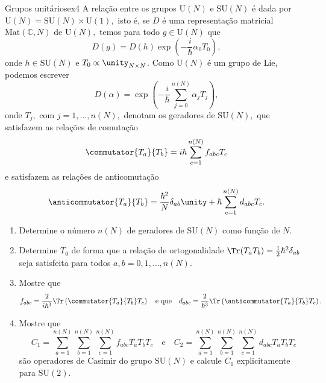 \begin{exercício}{Grupos unitários}{ex4}
    A relação entre os grupos \(\mathrm{U}(N)\) e \(\mathrm{SU}(N)\) é dada por \(\mathrm{U}(N) = \mathrm{SU}(N) \times \mathrm{U}(1),\) isto é, se \(D\) é uma representação matricial \(\mathrm{Mat}(\mathbb{C}, N)\) de \(\mathrm{U}(N),\) temos para todo \(g \in \mathrm{U}(N)\) que
    \begin{equation*}
        D(g) = D(h) \exp\left(-\frac{i}{\hbar}\alpha_0 T_0\right),
    \end{equation*}
    onde \(h \in \mathrm{SU}(N)\) e \(T_0 \propto \unity_{N\times N}\). Como \(\mathrm{U}(N)\) é um grupo de Lie, podemos escrever
    \begin{equation*}
        D(\alpha) = \exp\left(-\frac{i}{\hbar}\sum_{j = 0}^{n(N)} \alpha_j T_j\right),
    \end{equation*}
    onde \(T_j,\) com \(j = 1, \dots, n(N),\) denotam os geradores de \(\mathrm{SU}(N),\) que satisfazem as relações de comutação
    \begin{equation*}
        \commutator{T_a}{T_b} = i\hbar\sum_{c = 1}^{n(N)} f_{abc} T_c
    \end{equation*}
    e satisfazem as relações de anticomutação
    \begin{equation*}
    \anticommutator{T_a}{T_b} = \frac{\hbar^2}{N} \delta_{ab} \unity + \hbar \sum_{c = 1}^{n(N)} d_{abc} T_c.
    \end{equation*}
    \begin{enumerate}[label=(\alph*)]
        \item Determine o número \(n(N)\) de geradores de \(\mathrm{SU}(N)\) como função de \(N\).
        \item Determine \(T_0\) de forma que a relação de ortogonalidade \(\Tr(T_a T_b) = \frac12 \hbar^2 \delta_{ab}\) seja satisfeita para todos \(a,b = 0,1, \dots, n(N).\)
        \item Mostre que
            \begin{equation*}
                f_{abc} = \frac{2}{i \hbar^3} \Tr\left(\commutator{T_a}{T_b}T_c\right)
                \quad\text{e que}\quad
                d_{abc} = \frac{2}{\hbar^3} \Tr\left(\anticommutator{T_a}{T_b}T_c\right).
            \end{equation*}
        \item Mostre que 
            \begin{equation*}
                C_1 = \sum_{a = 1}^{n(N)} \sum_{b = 1}^{n(N)} \sum_{c = 1}^{n(N)} f_{abc} T_a T_b T_c\quad\text{e}\quad C_2 = \sum_{a = 1}^{n(N)} \sum_{b = 1}^{n(N)} \sum_{c = 1}^{n(N)} d_{abc} T_a T_b T_c
            \end{equation*}
            são operadores de Casimir do grupo \(\mathrm{SU}(N)\) e calcule \(C_1\) explicitamente para \(\mathrm{SU}(2).\)
    \end{enumerate}
\end{exercício}

